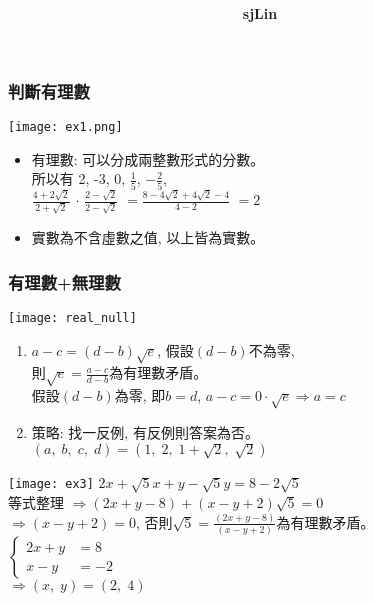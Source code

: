 \documentclass{beamer}
\title{\textbf{}}
\author{\textbf{sjLin}}
\begin{document}
{\selectfont
\begin{CJK*}{UTF8}{bkai}






\begin{frame}
\frametitle{判斷有理數}
\texttt{[image: ex1.png]}
\begin{itemize}
 \item 
有理數: 可以分成兩整數形式的分數。\\
所以有 2, -3, 0, $\frac{1}{5}$, $-\frac{2}{5}$,\\
$
\frac{4+2\sqrt{2}}{2+\sqrt{2}}
$
$\cdot$
$
\frac{2-\sqrt{2}}{2-\sqrt{2}}
$
$=
\frac{8-4\sqrt{2}+4\sqrt{2}-4}{4-2}
$
$= 2$

 \item
實數為不含虛數之值, 以上皆為實數。


\end{itemize}

\end{frame}

\begin{frame}
 \frametitle{有理數+無理數} 
\texttt{[image: real\_null]}
\begin{enumerate}
 \item 
$
a-c=(d-b)\sqrt{e}
$, 假設$(d-b)$不為零,\\
則$\sqrt{e}=\frac{a-c}{d-b}$為有理數矛盾。 \\[0.5cm]
假設$(d-b)$為零, 即$b=d$, $a-c=0\cdot \sqrt{e}\Rightarrow a=c$

\item
策略: 找一反例, 有反例則答案為否。\\
$(a,\;b,\;c,\;d)=(1,\;2,\;1+\sqrt{2},\; \sqrt{2})$
\end{enumerate}
\end{frame}
\begin{frame}
 \texttt{[image: ex3]}
 $
 2x+\sqrt{5}x+y-\sqrt{5}y
 =
 8-2\sqrt{5}
 $\\
 等式整理
 $\Rightarrow (2x+y-8)+(x-y+2)\sqrt{5}=0$\\
 $\Rightarrow (x-y+2)=0$, 否則$\sqrt{5}=\frac{(2x+y-8)}{(x-y+2)}$為有理數矛盾。
 \\
 $
 \begin{cases}
  2x+y &=8\\
  x-y  &=-2
 \end{cases}
 $\\[0.5cm]
 $\Rightarrow (x,\;y)=(2,\;4)$
\end{frame}


\end{CJK*}}
\end{document}
